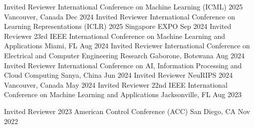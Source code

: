 


\begin{cvhonors}
\cvhonor
{Invited Reviewer} %
{International Conference on Machine Learning (ICML) 2025} %
{Vancouver, Canada} %
{Dec 2024} %
\cvhonor
{Invited Reviewer} %
{International Conference on Learning Representations (ICLR) 2025} %
{Singapore EXPO} %
{Sep 2024} %
\cvhonor
{Invited Reviewer} %
{23rd IEEE International Conference on Machine Learning and Applications} %
{Miami, FL} %
{Aug 2024} %
\cvhonor
{Invited Reviewer} %
{International  Conference on Electrical and Computer Engineering Research} %
{Gaborone, Botswana} %
{Aug 2024} %
\cvhonor
{Invited Reviewer} %
{International Conference on AI, Information Processing and Cloud Computing} %
{Sanya, China} %
{Jun 2024} %
\cvhonor
{Invited Reviewer} %
{NeuRIPS 2024} %
{Vancouver, Canada} %
{May 2024} %
\cvhonor
{Invited Reviewer} %
{22nd IEEE International Conference on Machine Learning and Applications} %
{Jacksonville, FL} %
{Aug 2023} %

\cvhonor
{Invited Reviewer} %
{2023 American Control Conference (ACC)} %
{San Diego, CA} %
{Nov 2022} %












\end{cvhonors}
